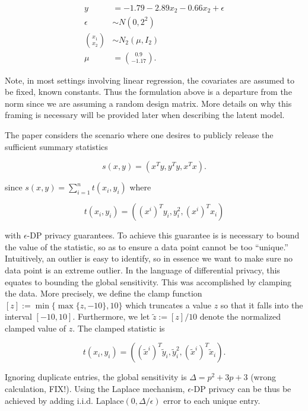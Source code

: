 \[
\begin{aligned}
y &= -1.79 -2.89x_2 -0.66x_2 + \epsilon\\
\epsilon &\sim N(0,2^2)\\
\binom{x_1}{x_2} &\sim N_{2}(\mu, I_2)\\
\mu &= \binom{0.9}{-1.17}.
\end{aligned}
\]

Note, in most settings involving linear regression, the covariates are assumed to be
fixed, known constants. Thus the formulation above is a departure from the norm since
we are assuming a random design matrix. More details on why this framing is necessary
will be provided later when describing the latent model.

The paper considers the scenario where one desires to publicly release the
sufficient summary statistics

\[
s(x,y) = (x^Ty, y^Ty, x^Tx).
\]

since \(s(x,y) = \sum_{i=1}^{n} t(x_i, y_i)\) where

\[
t(x_i,y_i) = ((x^{i})^T y_i, y_i^2, (x^{i})^T x_i)
\]

with \(\epsilon\)-DP privacy guarantees. To achieve this guarantee is is
necessary to bound the value of the statistic, so as to ensure
a data point cannot be too ``unique.'' Intuitively, an outlier is
easy to identify, so in essence we want to make sure no data point
is an extreme outlier. In the language of differential
privacy, this equates to bounding the global sensitivity. This was accomplished
by clamping the data. More precisely, we define
the clamp function \([z] := \min\{\max\{z,-10\}, 10\}\) which truncates a value
\(z\) so that it falls into the interval \([-10,10]\). Furthermore, we let \(\tilde{z} := [z]/10\)
denote the normalized clamped value of \(z\). The clamped statistic is

\[
t(x_i,y_i) = ((\tilde{x}^{i})^T \tilde{y}_i, \tilde{y}_i^2, (\tilde{x}^{i})^T \tilde{x}_i).
\]

Ignoring duplicate entries, the global sensitivity is \(\Delta = p^2 + 3p + 3\) (wrong calculation, FIX!).
Using the Laplace mechanism, \(\epsilon\)-DP privacy can be thus be achieved by adding i.i.d. Laplace\((0, \Delta/\epsilon)\)
error to each unique entry.

